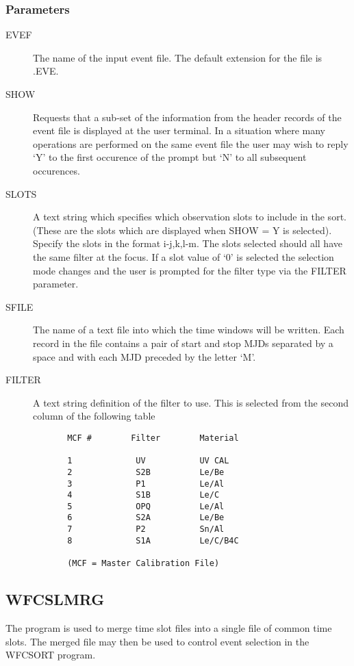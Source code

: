 \subsubsection{Parameters}
\begin{description}
\item[EVEF]
The name of the input event file.
The default extension for the file is .EVE.
\item[SHOW]
Requests that a sub-set of the information from the header records of the
event file is displayed at the user terminal. In a situation where many
operations are performed on the same event file the user may wish to 
reply `Y' to the first occurence of the prompt but `N' to all subsequent
occurences.
\item[SLOTS]
A text string which specifies which observation slots to include in
the sort. (These are the slots which are displayed when SHOW = Y is selected).
Specify the slots in the format i-j,k,l-m. The slots selected
should all have the same filter at the focus. If a slot value of `0' is
selected the selection mode changes and the user is prompted for the 
filter type via the FILTER parameter.
\item[SFILE]
The name of a text file into which the time windows will be written.
Each record in the file contains a pair of start and stop MJDs
separated by a space and with each MJD preceded by the letter `M'.
\item[FILTER]
A text string definition of the filter to use. This is selected from
the second column of the following table
\begin{verbatim}
       MCF #        Filter        Material

       1             UV           UV CAL
       2             S2B          Le/Be
       3             P1           Le/Al
       4             S1B          Le/C
       5             OPQ          Le/Al
       6             S2A          Le/Be
       7             P2           Sn/Al
       8             S1A          Le/C/B4C
 
       (MCF = Master Calibration File)
\end{verbatim}

\end{description}
\subsection{WFCSLMRG}
The program is used to merge time slot files into a single file of common
time slots. The merged file may then be used to control event selection in 
the WFCSORT program.

